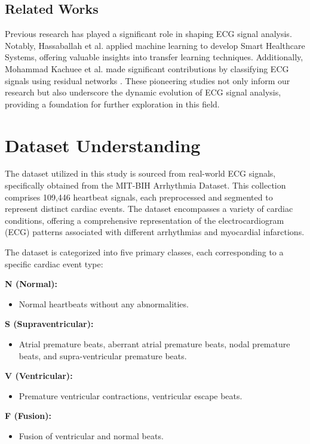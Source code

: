 \documentclass[]{acmsiggraph}
\begin{document}
\subsection{Related Works}
Previous research has played a significant role in shaping ECG signal analysis. Notably, Hassaballah et al. \cite{hassaballah2023} applied machine learning to develop Smart Healthcare Systems, offering valuable insights into transfer learning techniques. Additionally, Mohammad Kachuee et al. made significant contributions by classifying ECG signals using residual networks \cite{kachuee2018}. These pioneering studies not only inform our research but also underscore the dynamic evolution of ECG signal analysis, providing a foundation for further exploration in this field.

\section{Dataset Understanding}
The dataset utilized in this study is sourced from real-world ECG signals, specifically obtained from the MIT-BIH Arrhythmia Dataset. This collection comprises 109,446 heartbeat signals, each preprocessed and segmented to represent distinct cardiac events. The dataset encompasses a variety of cardiac conditions, offering a comprehensive representation of the electrocardiogram (ECG) patterns associated with different arrhythmias and myocardial infarctions.

The dataset is categorized into five primary classes, each corresponding to a specific cardiac event type:

\textbf{N (Normal):}
\begin{itemize}
    \item Normal heartbeats without any abnormalities.
\end{itemize}

\textbf{S (Supraventricular):}
\begin{itemize}
    \item Atrial premature beats, aberrant atrial premature beats, nodal premature beats, and supra-ventricular premature beats.
\end{itemize}

\textbf{V (Ventricular):}
\begin{itemize}
    \item Premature ventricular contractions, ventricular escape beats.
\end{itemize}

\textbf{F (Fusion):}
\begin{itemize}
    \item Fusion of ventricular and normal beats.
\end{itemize}
\end{document}
